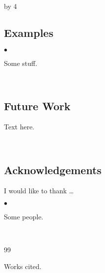 \documentclass[14pt]{scrartcl}
\newenvironment{citemize}{
\begin{list}{$\bullet$}{\setlength{\itemsep}{0pt} \setlength{\rightmargin}{0pt} \setlength{\leftmargin}{0.5\labelwidth} \setlength{\topsep}{0pt}}
}{\end{list}}
\def\anzspalten{4}
\newlength{\kastenwidth}
\newenvironment{kasten}{%
  \begin{lrbox}{\dummybox}%
    \begin{minipage}{0.96\linewidth}}%
    {\end{minipage}%
  \end{lrbox}%
  \raisebox{-\depth}{\psshadowbox[framesep=1em]{\usebox{\dummybox}}}\\[0.5em]}
\newenvironment{spalte}{%
  \setlength\kastenwidth{1.2\textwidth}
  \divide\kastenwidth by \anzspalten
  \begin{minipage}[t]{\kastenwidth}}{\end{minipage}\hfill}
\begin{document}
\begin{lrbox}{\spalten}
{\begin{spalte}
\begin{kasten}
  \subsection*{{\color{blue} \large Examples}}

\begin{citemize}
\item Some stuff.
\end{citemize}

\end{kasten}

\begin{kasten}
\subsection*{{\color{blue} \large Future Work}}
Text here.
\end{kasten}

\begin{kasten}
\subsection*{{\color{blue} Acknowledgements}}
I would like to thank \ldots
\begin{citemize}
\item Some people.
\end{citemize}
\end{kasten}

\begin{kasten}
         {\small
\begin{thebibliography}{99}
\setlength{\itemsep}{-2mm}

 Works cited.

\end{thebibliography}
} %
\end{kasten}

\end{spalte}
    }
    \end{lrbox}
\resizebox*{0.98\textwidth}{!}{%
  \usebox{\spalten}}\hfill\mbox{}\vfill
\end{document}
